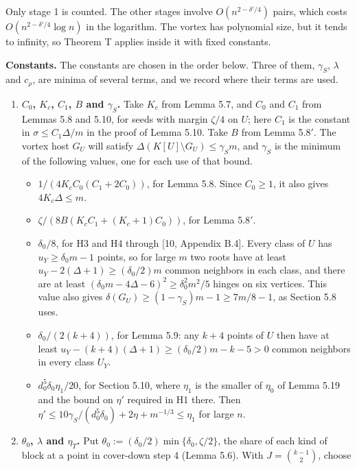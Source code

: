 \documentclass[english,11pt,a4paper]{article}
\providecommand{\tightlist}{\setlength{\itemsep}{0pt}\setlength{\parskip}{0pt}}
\begin{document}
Only stage 1 is counted. The other stages involve \(O(n^{2-\delta'/4})\) pairs, which costs \(O(n^{2-\delta'/4}\log n)\) in the logarithm. The vortex has polynomial size, but it tends to infinity, so Theorem T applies inside it with fixed constants.

\textbf{Constants.} The constants are chosen in the order below. Three of them, \(\gamma_S\), \(\lambda\) and \(c_\rho\), are minima of several terms, and we record where their terms are used.

\begin{enumerate}
\def\labelenumi{\arabic{enumi}.}
\item
  \textbf{\(C_0\), \(K_c\), \(C_1\), \(B\) and \(\gamma_S\).} Take \(K_c\) from Lemma 5.7, and \(C_0\) and \(C_1\) from Lemmas 5.8 and 5.10, for seeds with margin \(\zeta/4\) on \(U\); here \(C_1\) is the constant in \(\sigma\le C_1\Delta/m\) in the proof of Lemma 5.10. Take \(B\) from Lemma 5.8\('\). The vortex host \(G_U\) will satisfy \(\Delta(K[U]\setminus G_U)\le\gamma_S m\), and \(\gamma_S\) is the minimum of the following values, one for each use of that bound.

  \begin{itemize}
  \tightlist
  \item
    \(1/(4K_cC_0(C_1+2C_0))\), for Lemma 5.8. Since \(C_0\ge1\), it also gives \(4K_c\Delta\le m\).
  \item
    \(\zeta/(8B(K_cC_1+(K_c+1)C_0))\), for Lemma 5.8\('\).
  \item
    \(\delta_0/8\), for H3 and H4 through {[}10, Appendix B.4{]}. Every class of \(U\) has \(u_Y\ge\delta_0m-1\) points, so for large \(m\) two roots have at least \(u_Y-2(\Delta+1)\ge(\delta_0/2)m\) common neighbors in each class, and there are at least \((\delta_0m-4\Delta-6)^2\ge\delta_0^2m^2/5\) hinges on six vertices. This value also gives \(\delta(G_U)\ge(1-\gamma_S)m-1\ge7m/8-1\), as Section 5.8 uses.
  \item
    \(\delta_0/(2(k+4))\), for Lemma 5.9: any \(k+4\) points of \(U\) then have at least \(u_Y-(k+4)(\Delta+1)\ge(\delta_0/2)m-k-5>0\) common neighbors in every class \(U_Y\).
  \item
    \(d_0^5\delta_0\eta_1/20\), for Section 5.10, where \(\eta_1\) is the smaller of \(\eta_0\) of Lemma 5.19 and the bound on \(\eta'\) required in H1 there. Then \(\eta'\le10\gamma_S/(d_0^5\delta_0)+2\eta+m^{-1/3}\le\eta_1\) for large \(n\).
  \end{itemize}
\item
  \textbf{\(\theta_0\), \(\lambda\) and \(\eta_T\).} Put \(\theta_0:=(\delta_0/2)\min\{\delta_0,\zeta/2\}\), the share of each kind of block at a point in cover-down step 4 (Lemma 5.6). With \(J=\binom{k-1}{2}\), choose


\end{enumerate}
\end{document}
